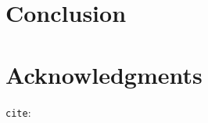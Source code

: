 \documentclass[runningheads]{llncs}
\begin{document}

\section{Conclusion}

\section*{Acknowledgments}

\verb|cite|: \cite{tompson2014joint}





\end{document}
